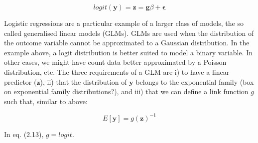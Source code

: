 \begin{equation}\label{eq13:Logistic_regression_genetics_z}
 logit(\mathbf{y}) = \mathbf{z} = \mathbf{g}\beta + \boldsymbol{\epsilon} 
\end{equation}

Logistic regressions are a particular example of a larger class of models, the so called generalised linear models (GLMs). 
GLMs are used when the distribution of the outcome variable cannot be approximated to a Gaussian distribution. 
In the example above, a logit distribution is better suited to model a binary variable. 
In other cases, we might have count data better approximated by a Poisson distribution, etc.
The three requirements of a GLM are i) to have a linear predictor ($\mathbf{z}$), ii) that the distribution of $\mathbf{y}$  belongs to the exponential family (box on exponential family distributions?), and iii) that we can define a link function $g$ such that, similar to above:

\begin{equation*}
 E[\mathbf{y}] = g(\mathbf{z})^{-1} 
\end{equation*}

In eq. (2.13), $ g = logit $.



\newpage

